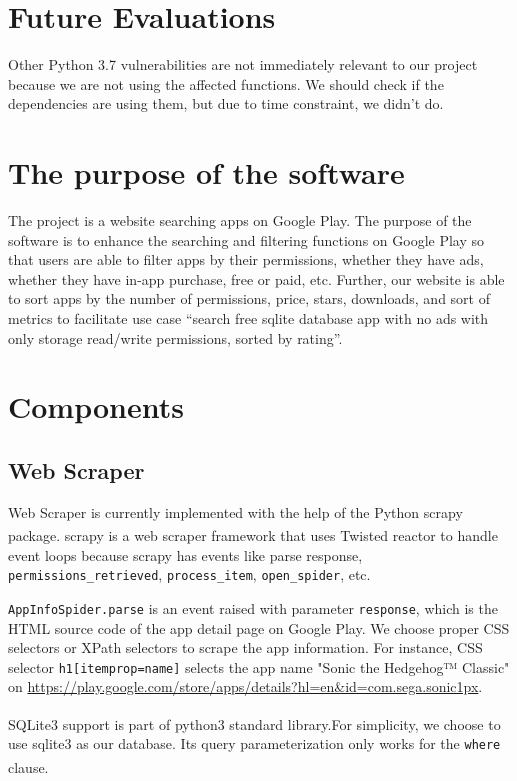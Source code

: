 \documentclass[12pt, a4paper]{article}
\newcommand{\code}[1]{\texttt{#1}}
\begin{document}
\section{Future Evaluations}
Other Python 3.7 vulnerabilities are not immediately relevant to our project because we are not using the affected functions. We should check if the dependencies are using them, but due to time constraint, we didn't do.


\section{The purpose of the software}
The project is a website searching apps on Google Play. The purpose of the software is to enhance the searching and filtering functions on Google Play so that users are able to filter apps by their permissions, whether they have ads, whether they have in-app purchase, free or paid, etc. Further, our website is able to sort apps by the number of permissions, price, stars, downloads, and sort of metrics to facilitate use case “search free sqlite database app with no ads with only storage read/write permissions, sorted by rating”.



\section{Components}
\subsection{Web Scraper}
Web Scraper is currently implemented with the help of the Python scrapy package\textsuperscript{\cite{scrapy}}. scrapy is a web scraper framework that uses Twisted reactor\textsuperscript{\cite{reactor}} to handle event loops because scrapy has events like parse response, \code{permissions\linebreak[2]\_retrieved}, \code{process\_item}, \code{open\_spider}, etc.

\code{AppInfoSpider.parse} is an event raised with parameter \code{response}, which is the HTML source code of the app detail page on Google Play. We choose proper CSS selectors or XPath selectors to scrape the app information. For instance, CSS selector \code{h1[itemprop=name]} selects the app name "Sonic the Hedgehog™ Classic" on \url{https://play.google.com/store/apps/details?hl=en&id=com.sega.sonic1px}.

SQLite3 support is part of python3 standard library.\textsuperscript{\cite{python-sqlite}}For simplicity, we choose to use sqlite3 as our database. Its query parameterization only works for the \code{where} clause.\textsuperscript{\cite{sqliteC++}}
\end{document}
